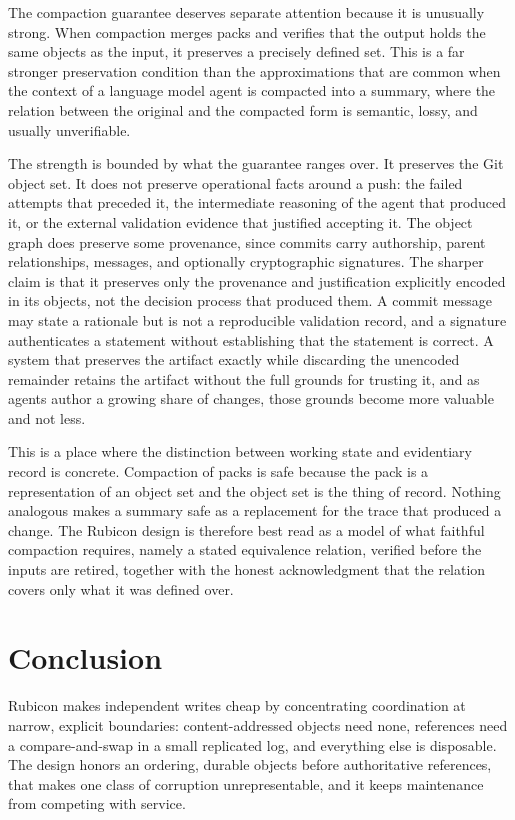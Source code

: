 \documentclass[11pt]{article}
\theoremstyle{definition}
\theoremstyle{plain}
\begin{document}
The compaction guarantee deserves separate attention because it is unusually strong. When compaction merges packs and verifies that the output holds the same objects as the input, it preserves a precisely defined set. This is a far stronger preservation condition than the approximations that are common when the context of a language model agent is compacted into a summary, where the relation between the original and the compacted form is semantic, lossy, and usually unverifiable.

The strength is bounded by what the guarantee ranges over. It preserves the Git object set. It does not preserve operational facts around a push: the failed attempts that preceded it, the intermediate reasoning of the agent that produced it, or the external validation evidence that justified accepting it. The object graph does preserve some provenance, since commits carry authorship, parent relationships, messages, and optionally cryptographic signatures. The sharper claim is that it preserves only the provenance and justification explicitly encoded in its objects, not the decision process that produced them. A commit message may state a rationale but is not a reproducible validation record, and a signature authenticates a statement without establishing that the statement is correct. A system that preserves the artifact exactly while discarding the unencoded remainder retains the artifact without the full grounds for trusting it, and as agents author a growing share of changes, those grounds become more valuable and not less.

This is a place where the distinction between working state and evidentiary record is concrete. Compaction of packs is safe because the pack is a representation of an object set and the object set is the thing of record. Nothing analogous makes a summary safe as a replacement for the trace that produced a change. The Rubicon design is therefore best read as a model of what faithful compaction requires, namely a stated equivalence relation, verified before the inputs are retired, together with the honest acknowledgment that the relation covers only what it was defined over.

\section{Conclusion}

Rubicon makes independent writes cheap by concentrating coordination at narrow, explicit boundaries: content-addressed objects need none, references need a compare-and-swap in a small replicated log, and everything else is disposable. The design honors an ordering, durable objects before authoritative references, that makes one class of corruption unrepresentable, and it keeps maintenance from competing with service.
\end{document}
